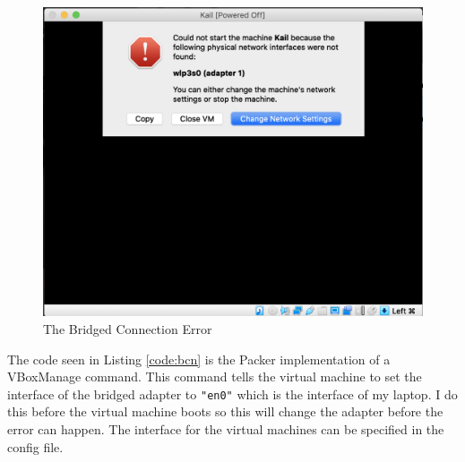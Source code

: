 \begin{figure}[h]
    \centering
    \includegraphics[scale=0.5]{Images/vm_error.png}
    \caption{The Bridged Connection Error}
    \label{fig:vmerror}
\end{figure}

The code seen in Listing \ref{code:bcn} is the Packer implementation of a VBoxManage command. This command tells the virtual machine to set the interface of the bridged adapter to \texttt{"en0"} which is the interface of my laptop. I do this before the virtual machine boots so this will change the adapter before the error can happen. The interface for the virtual machines can be specified in the config file.









